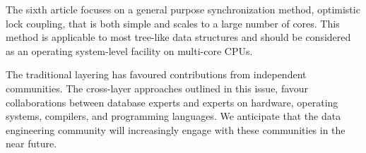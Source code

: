 \documentclass[11pt]{article}
\begin{document}
The sixth article focuses on a general purpose synchronization method, optimistic lock coupling, that is both
simple and scales to a large number of cores. This method is applicable to most tree-like data structures and
should be considered as an operating system-level facility on multi-core CPUs.

The traditional layering has favoured contributions from independent communities. The cross-layer approaches
outlined in this issue, favour collaborations between database experts and experts on
hardware, operating systems, compilers, and programming languages. 
We anticipate that the data engineering community will increasingly engage with these communities in the near
future.
\end{document}
